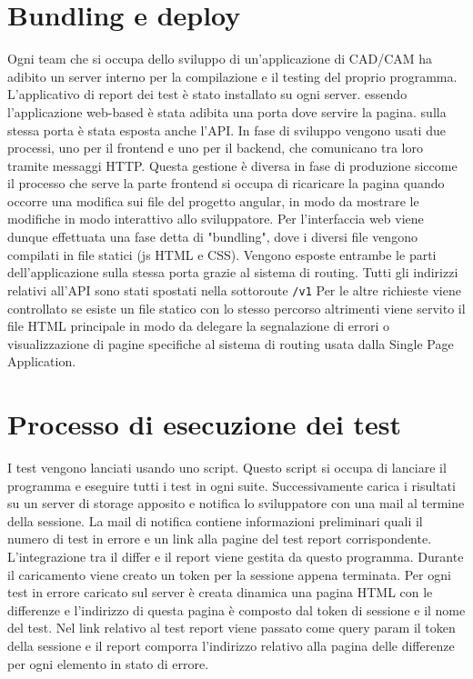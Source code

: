     \section{Bundling e deploy}
        Ogni team che si occupa dello sviluppo di un'applicazione di CAD/CAM ha adibito un server interno per la compilazione e il testing del proprio programma.
        L'applicativo di report dei test è stato installato su ogni server.
        essendo l'applicazione web-based è stata adibita una porta dove servire la pagina.
        sulla stessa porta è stata esposta anche l'API.
        In fase di sviluppo vengono usati due processi, uno per il frontend e uno per il backend, che comunicano tra loro tramite messaggi HTTP.
        Questa gestione è diversa in fase di produzione siccome il processo che serve la parte frontend si occupa di ricaricare la pagina quando occorre una modifica sui file del progetto angular, in modo da mostrare le modifiche in modo interattivo allo sviluppatore.
        Per l'interfaccia web viene dunque effettuata una fase detta di "bundling", dove i diversi file  vengono compilati in file statici (js HTML e CSS).
        Vengono esposte entrambe le parti dell'applicazione sulla stessa porta grazie al sistema di routing.
        Tutti gli indirizzi relativi all'API sono stati spostati nella sottoroute \verb|/v1|
        Per le altre richieste viene controllato se esiste un file statico con lo stesso percorso altrimenti viene servito il file HTML principale in modo da delegare la segnalazione di errori o visualizzazione di pagine specifiche al sistema di routing usata dalla Single Page Application.

    \section{Processo di esecuzione dei test\label{testexecution}}
        I test vengono lanciati usando uno script.
        Questo script si occupa di lanciare il programma e eseguire tutti i test in ogni suite.
        Successivamente carica i risultati su un server di storage apposito e notifica lo sviluppatore con una mail al termine della sessione.
        La mail di notifica contiene informazioni preliminari quali il numero di test in errore e un link alla pagine del test report corrispondente.
        L'integrazione tra il differ e il report viene gestita da questo programma.
        Durante il caricamento viene creato un token per la sessione appena terminata.
        Per ogni test in errore caricato sul server è creata dinamica una pagina HTML con le differenze e l'indirizzo di questa pagina è composto dal token di sessione e il nome del test.
        Nel link relativo al test report viene passato come query param il token della sessione e il report comporra l'indirizzo relativo alla pagina delle differenze per ogni elemento in stato di errore.
